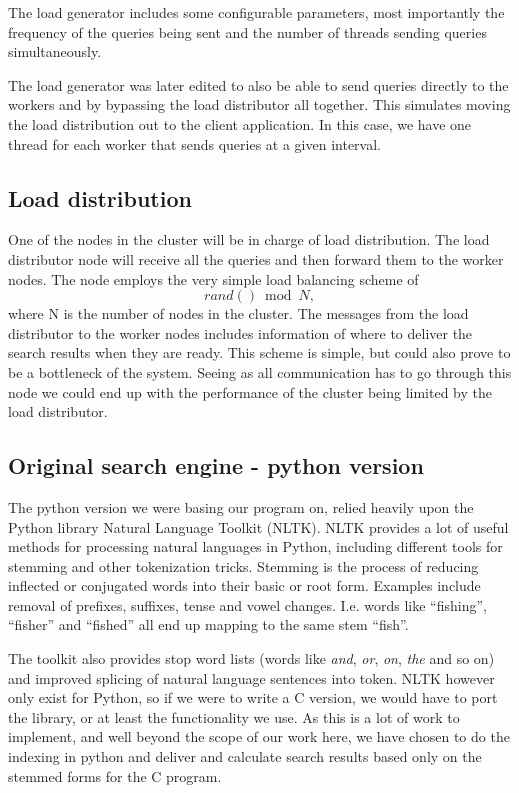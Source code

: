 The load generator includes some configurable parameters, most importantly the frequency of the queries being sent and the number of threads sending queries simultaneously.

The load generator was later edited to also be able to send queries directly to the workers and by bypassing the load distributor all together. This simulates moving the load distribution out to the client application. In this case, we have one thread for each worker that sends queries at a given interval.

\subsection{Load distribution}
One of the nodes in the cluster will be in charge of load distribution. The load distributor node will receive all the queries and then forward them to the worker nodes.
The node employs the very simple load balancing scheme of $$rand() \bmod N,$$ where N is the number of nodes in the cluster.
The messages from the load distributor to the worker nodes includes information of where to deliver the search results when they are ready.
This scheme is simple, but could also prove to be a bottleneck of the system. Seeing as all communication has to go through this node we could end up with the performance of the cluster being limited by the load distributor.

\subsection{Original search engine - python version}
The python version we were basing our program on, relied heavily upon the Python library Natural Language Toolkit\cite{nltk} (NLTK).
NLTK provides a lot of useful methods for processing natural languages in Python, including different tools for stemming and other tokenization tricks.
Stemming is the process of reducing inflected or conjugated words into their basic or root form. Examples include removal of prefixes, suffixes, tense and vowel changes. I.e. words like ``fishing'', ``fisher'' and ``fished'' all end up mapping to the same stem ``fish''.

The toolkit also provides stop word lists (words like {\em and}, {\em or}, {\em on}, {\em the} and so on) and improved splicing of natural language sentences into token.
NLTK however only exist for Python, so if we were to write a C version, we would have to port the library, or at least the functionality we use.
As this is a lot of work to implement, and well beyond the scope of our work here, we have chosen to do the indexing in python and deliver and calculate search results based only on the stemmed forms for the C program.

